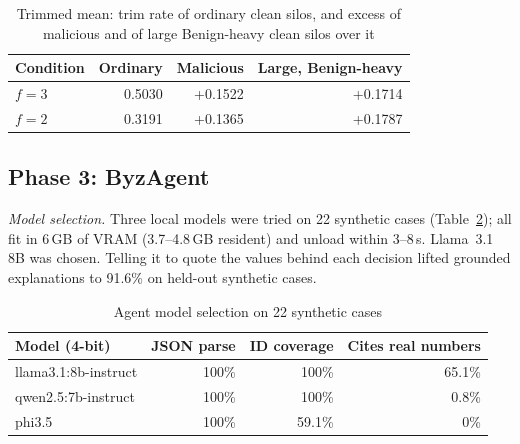 \begin{table}[h]
\centering
\caption{Trimmed mean: trim rate of ordinary clean silos, and excess of malicious and of large Benign-heavy clean silos over it}
\label{tab:trim}
\footnotesize
\begin{tabular}{@{}lrrr@{}}
\toprule
Condition & Ordinary & Malicious & Large, Benign-heavy\\
\midrule
$f=3$ & 0.5030 & +0.1522 & +0.1714\\ %
$f=2$ & 0.3191 & +0.1365 & +0.1787\\ %
\bottomrule
\end{tabular}
\end{table}

\subsection{Phase 3: ByzAgent}
\emph{Model selection.} Three local models were tried on 22 synthetic cases %
(Table~\ref{tab:llmselect}); all fit in 6\,GB of VRAM (3.7--4.8\,GB resident) and unload %
within 3--8\,s. Llama~3.1 8B was chosen. Telling it to quote the values behind each %
decision lifted grounded explanations to 91.6\% on held-out synthetic cases. %

\begin{table}[h]
\centering
\caption{Agent model selection on 22 synthetic cases} %
\label{tab:llmselect}
\footnotesize
\setlength{\tabcolsep}{3pt}
\begin{tabular}{@{}lrrr@{}}
\toprule
Model (4-bit) & JSON parse & ID coverage & Cites real numbers\\ %
\midrule
llama3.1:8b-instruct & 100\% & 100\% & 65.1\%\\ %
qwen2.5:7b-instruct & 100\% & 100\% & 0.8\%\\ %
phi3.5 & 100\% & 59.1\% & 0\%\\ %
\bottomrule
\end{tabular}
\end{table}

